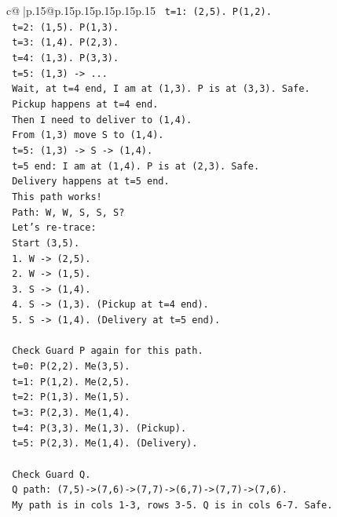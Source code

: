 \documentclass{article}
\begin{document}
{\begin{supertabular}{c@{$\;$}|p{.15\linewidth}@{}p{.15\linewidth}p{.15\linewidth}p{.15\linewidth}p{.15\linewidth}p{.15\linewidth}}
{{{\texttt{   t=1: (2,5). P(1,2).} \\
\texttt{   t=2: (1,5). P(1,3).} \\
\texttt{   t=3: (1,4). P(2,3).} \\
\texttt{   t=4: (1,3). P(3,3).} \\
\texttt{   t=5: (1,3) {-}> ...} \\
\texttt{   Wait, at t=4 end, I am at (1,3). P is at (3,3). Safe.} \\
\texttt{   Pickup happens at t=4 end.} \\
\texttt{   Then I need to deliver to (1,4).} \\
\texttt{   From (1,3) move S to (1,4).} \\
\texttt{   t=5: (1,3) {-}> S {-}> (1,4).} \\
\texttt{   t=5 end: I am at (1,4). P is at (2,3). Safe.} \\
\texttt{   Delivery happens at t=5 end.} \\
\texttt{   This path works!} \\
\texttt{   Path: W, W, S, S, S?} \\
\texttt{   Let's re{-}trace:} \\
\texttt{   Start (3,5).} \\
\texttt{   1. W {-}> (2,5).} \\
\texttt{   2. W {-}> (1,5).} \\
\texttt{   3. S {-}> (1,4).} \\
\texttt{   4. S {-}> (1,3). (Pickup at t=4 end).} \\
\texttt{   5. S {-}> (1,4). (Delivery at t=5 end).} \\
\\ 
\texttt{   Check Guard P again for this path.} \\
\texttt{   t=0: P(2,2). Me(3,5).} \\
\texttt{   t=1: P(1,2). Me(2,5).} \\
\texttt{   t=2: P(1,3). Me(1,5).} \\
\texttt{   t=3: P(2,3). Me(1,4).} \\
\texttt{   t=4: P(3,3). Me(1,3). (Pickup).} \\
\texttt{   t=5: P(2,3). Me(1,4). (Delivery).} \\
\\ 
\texttt{   Check Guard Q.} \\
\texttt{   Q path: (7,5){-}>(7,6){-}>(7,7){-}>(6,7){-}>(7,7){-}>(7,6).} \\
\texttt{   My path is in cols 1{-}3, rows 3{-}5. Q is in cols 6{-}7. Safe.} \\
}}}
\end{supertabular}}
\end{document}
